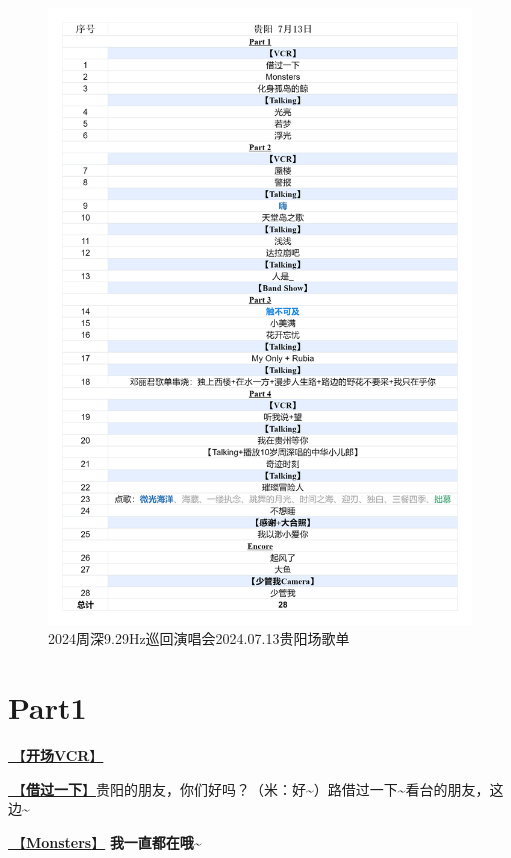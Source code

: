 \documentclass[]{ctexbook}
\begin{document}
\begin{figure}

{\centering \includegraphics[width=330pt]{img/playlists/playlists-guiyang-20240713} 

}

\caption{2024周深9.29Hz巡回演唱会2024.07.13贵阳场歌单}\label{fig:unnamed-chunk-58}
\end{figure}

\newpage

\section{Part1}\label{guiyang-20240713-part1}

\hyperref[opening-vcr]{🎥【\textbf{开场VCR}】}

\hyperref[I-will-go-my-way]{🎵【\textbf{借过一下}】}贵阳的朋友，你们好吗？（米：好\textasciitilde）路借过一下\textasciitilde 看台的朋友，这边\textasciitilde{}

\hyperref[Monsters]{🎵【\textbf{Monsters}】} \textbf{我一直都在哦\textasciitilde{}}
\end{document}
